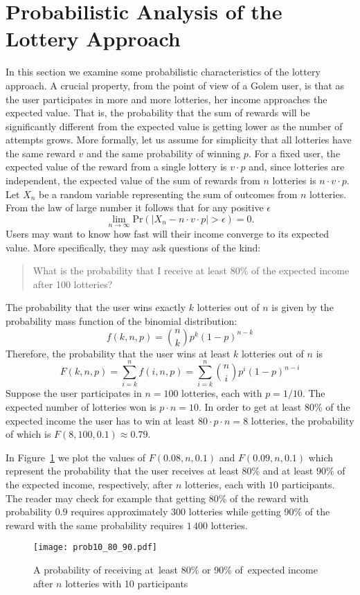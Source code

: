 \documentclass[a4paper]{article}
\begin{document}
\section{Probabilistic Analysis of the Lottery Approach}
\label{sec:probabilistic}
\newcommand{\total}[2]{\widehat{#1}_{#2}}
    In this section we examine some probabilistic characteristics of the lottery approach. A crucial property, from 
    the point of view of a Golem user, is that as the user participates in more and more lotteries, her income approaches
    the expected value. That is, the probability that the sum of rewards will be significantly different from the expected
    value is getting lower as the number of attempts grows. More formally, let us assume for simplicity that all lotteries
    have the same reward $v$ and the same probability of winning $p$. For a fixed user, the expected value of the reward
    from a single lottery is $v\cdot p$ and, since lotteries are independent, the expected value of the sum of rewards
    from $n$ lotteries is $n\cdot v\cdot p$. Let $X_n$ be a random variable representing the sum of outcomes from $n$ lotteries.
    From the law of large number it follows that for any positive $\epsilon$
    \[
    \lim_{n \to \infty} \mathrm{Pr}\left(\left| X_n - n\cdot v\cdot p \right| > \epsilon\right) = 0.
    \]
    Users may want to know how fast will their income converge to its expected value. More specifically, they may ask
    questions of the kind:
    \begin{quote}
      What is the probability that I receive at least 80\% of the expected income after 100 lotteries?
    \end{quote}
    The probability that the user wins exactly $k$ lotteries out of $n$ is given by the probability mass function
    of the binomial distribution:
    \[
    f(k, n, p) = \binom{n}{k} p^{k} (1 - p)^{n - k} 
    \]
    Therefore, the probability that the user wins at least $k$ lotteries out of $n$ is
    \[
    F(k, n, p) = \sum_{i = k}^{n} f(i, n, p) = \sum_{i = k}^{n} \binom{n}{i} p^{i} (1 - p)^{n - i} 
    \]
    Suppose the user participates in $n = 100$ lotteries, each with $p = 1/10$. The expected number of lotteries won is
    $p\cdot n = 10$. In order to get at least 80\% of the expected income the user has to win at least $80\cdot p\cdot n = 8$ lotteries, 
    the probability of which is $F(8, 100, 0.1) \approx 0.79$.

    In Figure~\ref{fig:expected} we plot the values of $F(0.08, n, 0.1)$ and $F(0.09, n, 0.1)$ which represent the probability
    that the user receives at least 80\% and at least 90\% of the expected income, respectively, after $n$ lotteries, each
    with $10$ participants. The reader may check for example that getting 80\% of the reward with probability $0.9$ requires
    approximately $300$ lotteries while getting 90\% of the reward with the same probability requires $1\,400$ lotteries.
    \begin{figure}
      \centering
      \texttt{[image: prob10\_80\_90.pdf]}
      \caption{A probability of receiving at~least 80\% or 90\% of~expected income after $n$
        lotteries with 10 participants}
      \label{fig:expected}
    \end{figure}
    
\end{document}
